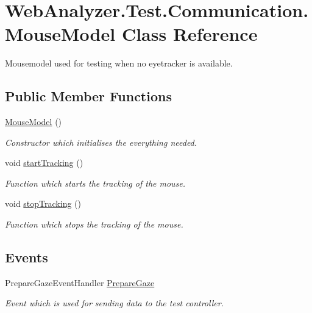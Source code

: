\hypertarget{class_web_analyzer_1_1_test_1_1_communication_1_1_mouse_model}{}\section{Web\+Analyzer.\+Test.\+Communication.\+Mouse\+Model Class Reference}
\label{class_web_analyzer_1_1_test_1_1_communication_1_1_mouse_model}


Mousemodel used for testing when no eyetracker is available.  


\subsection*{Public Member Functions}
\begin{DoxyCompactItemize}
\item 
\hyperlink{class_web_analyzer_1_1_test_1_1_communication_1_1_mouse_model_ad84f4a65000f2e03f7003546d5e63dd2}{Mouse\+Model} ()
\begin{DoxyCompactList}\small\item\em Constructor which initialises the everything needed. \end{DoxyCompactList}\item 
void \hyperlink{class_web_analyzer_1_1_test_1_1_communication_1_1_mouse_model_a6653ac676087ae6e96f00261cc7c61a9}{start\+Tracking} ()
\begin{DoxyCompactList}\small\item\em Function which starts the tracking of the mouse. \end{DoxyCompactList}\item 
void \hyperlink{class_web_analyzer_1_1_test_1_1_communication_1_1_mouse_model_ad60321c25b5ad81d8ccf389498318af2}{stop\+Tracking} ()
\begin{DoxyCompactList}\small\item\em Function which stops the tracking of the mouse. \end{DoxyCompactList}\end{DoxyCompactItemize}
\subsection*{Events}
\begin{DoxyCompactItemize}
\item 
Prepare\+Gaze\+Event\+Handler \hyperlink{class_web_analyzer_1_1_test_1_1_communication_1_1_mouse_model_ad799e6cf6032401ee7d8b1706d7c8a20}{Prepare\+Gaze}
\begin{DoxyCompactList}\small\item\em Event which is used for sending data to the test controller. \end{DoxyCompactList}\end{DoxyCompactItemize}
